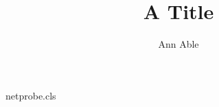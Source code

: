 \begin{filecontents*}[overwrite]{netprobe.cls}
\RequirePackage{CJKutf8}
\def\@anames{}\def\@xa{}
\renewcommand\author[1]{\gdef\@anames{#1}}
\newcommand\xa[1]{\gdef\@xa{作者单位：#1}}
\renewcommand\@author{\@anames\\\@xa}
\end{filecontents*}
\documentclass{netprobe}

\begin{CJK*}{UTF8}{gbsn}
\title{A Title}
\author{Ann Able}
\maketitle
Text.
\end{CJK*}


